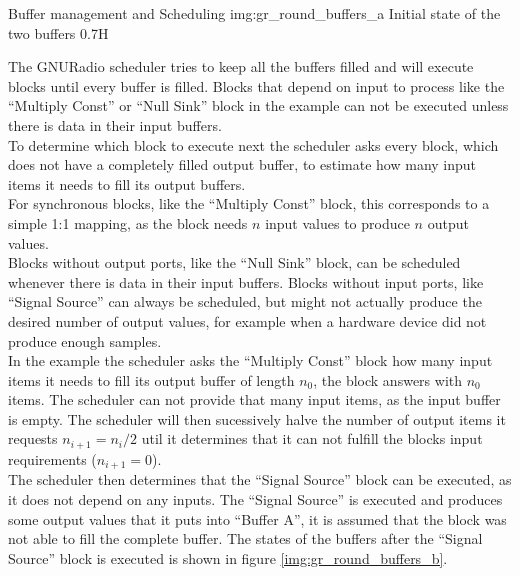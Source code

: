 \begin{subchapter}{Buffer management and Scheduling}
               {img:gr_round_buffers_a}
               {Initial state of the two buffers}
               {0.7}{H}

  The GNURadio scheduler tries to keep all the buffers filled
  and will execute blocks until every buffer is filled.
  Blocks that depend on input to process like the ``Multiply Const''
  or ``Null Sink'' block in the example can not be executed
  unless there is data in their input buffers. \\

  To determine which block to execute next the scheduler
  asks every block, which does not have a completely filled
  output buffer, to estimate how many input items it needs to fill
  its output buffers. \\

  For synchronous blocks, like the ``Multiply Const'' block,
  this corresponds to a simple 1:1 mapping, as the block
  needs $n$ input values to produce $n$ output values. \\

  Blocks without output ports, like the ``Null Sink'' block,
  can be scheduled whenever there is data in their input
  buffers.
  Blocks without input ports, like ``Signal Source'' can
  always be scheduled, but might not actually produce the
  desired number of output values, for example when a
  hardware device did not produce enough samples. \\

  In the example the scheduler asks the ``Multiply Const''
  block how many input items it needs to fill
  its output buffer of length $n_0$, the block answers with
  $n_0$ items.
  The scheduler can not provide that many input items,
  as the input buffer is empty.
  The scheduler will then sucessively halve the number
  of output items it requests $n_{i+1}=n_i/2$ util
  it determines that it can not fulfill the blocks
  input requirements ($n_{i+1}=0$). \\

  The scheduler then determines that the ``Signal Source''
  block can be executed, as it does not depend on any
  inputs.
  The ``Signal Source'' is executed and produces some
  output values that it puts into ``Buffer A'', it is assumed
  that the block was not able to fill the complete buffer.
  The states of the buffers after the ``Signal Source''
  block is executed is shown in figure \ref{img:gr_round_buffers_b}. \\


\end{subchapter}
